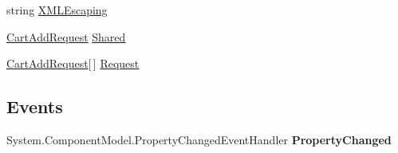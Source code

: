 \begin{DoxyCompactItemize}
\begin{DoxyCompactList}\small\item\em \end{DoxyCompactList}\item 
\hypertarget{class_price___comparison_1_1amazon_1_1ecs_1_1_cart_add_aec21a8c4ff0b875a3a1f1014046f4e3b}{string \hyperlink{class_price___comparison_1_1amazon_1_1ecs_1_1_cart_add_aec21a8c4ff0b875a3a1f1014046f4e3b}{X\-M\-L\-Escaping}}\label{class_price___comparison_1_1amazon_1_1ecs_1_1_cart_add_aec21a8c4ff0b875a3a1f1014046f4e3b}

\begin{DoxyCompactList}\small\item\em \end{DoxyCompactList}\item 
\hypertarget{class_price___comparison_1_1amazon_1_1ecs_1_1_cart_add_a0c4fcc85afa3acf2cf6c292b04cf90dd}{\hyperlink{class_price___comparison_1_1amazon_1_1ecs_1_1_cart_add_request}{Cart\-Add\-Request} \hyperlink{class_price___comparison_1_1amazon_1_1ecs_1_1_cart_add_a0c4fcc85afa3acf2cf6c292b04cf90dd}{Shared}}\label{class_price___comparison_1_1amazon_1_1ecs_1_1_cart_add_a0c4fcc85afa3acf2cf6c292b04cf90dd}

\begin{DoxyCompactList}\small\item\em \end{DoxyCompactList}\item 
\hypertarget{class_price___comparison_1_1amazon_1_1ecs_1_1_cart_add_a993f26d995414b1363f9e7863dda8e85}{\hyperlink{class_price___comparison_1_1amazon_1_1ecs_1_1_cart_add_request}{Cart\-Add\-Request}\mbox{[}$\,$\mbox{]} \hyperlink{class_price___comparison_1_1amazon_1_1ecs_1_1_cart_add_a993f26d995414b1363f9e7863dda8e85}{Request}}\label{class_price___comparison_1_1amazon_1_1ecs_1_1_cart_add_a993f26d995414b1363f9e7863dda8e85}

\begin{DoxyCompactList}\small\item\em \end{DoxyCompactList}\end{DoxyCompactItemize}
\subsection*{Events}
\begin{DoxyCompactItemize}
\item 
\hypertarget{class_price___comparison_1_1amazon_1_1ecs_1_1_cart_add_aa8e4092a9f60a9aa7aba0a8d262aa2a7}{System.\-Component\-Model.\-Property\-Changed\-Event\-Handler {\bfseries Property\-Changed}}\label{class_price___comparison_1_1amazon_1_1ecs_1_1_cart_add_aa8e4092a9f60a9aa7aba0a8d262aa2a7}

\end{DoxyCompactItemize}
